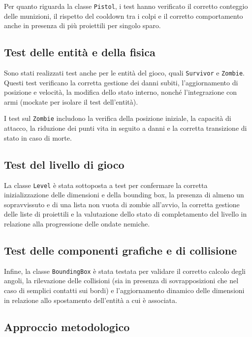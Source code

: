\documentclass[a4paper,12pt]{report}
\begin{document}
Per quanto riguarda la classe \texttt{Pistol}, i test hanno verificato il corretto conteggio delle munizioni, il rispetto del cooldown tra i colpi e il corretto comportamento anche in presenza di più proiettili per singolo sparo.

\subsection{Test delle entità e della fisica}

Sono stati realizzati test anche per le entità del gioco, quali \texttt{Survivor} e \texttt{Zombie}. Questi test verificano la corretta gestione dei danni subiti, l'aggiornamento di posizione e velocità, la modifica dello stato interno, nonché l'integrazione con armi (mockate per isolare il test dell'entità).

I test sul \texttt{Zombie} includono la verifica della posizione iniziale, la capacità di attacco, la riduzione dei punti vita in seguito a danni e la corretta transizione di stato in caso di morte.

\subsection{Test del livello di gioco}

La classe \texttt{Level} è stata sottoposta a test per confermare la corretta inizializzazione delle dimensioni e della bounding box, la presenza di almeno un sopravvissuto e di una lista non vuota di zombie all'avvio, la corretta gestione delle liste di proiettili e la valutazione dello stato di completamento del livello in relazione alla progressione delle ondate nemiche.

\subsection{Test delle componenti grafiche e di collisione}

Infine, la classe \texttt{BoundingBox} è stata testata per validare il corretto calcolo degli angoli, la rilevazione delle collisioni (sia in presenza di sovrapposizioni che nel caso di semplici contatti sui bordi) e l'aggiornamento dinamico delle dimensioni in relazione allo spostamento dell'entità a cui è associata.

\subsection{Approccio metodologico}
\end{document}
